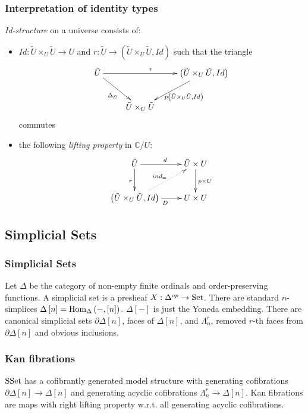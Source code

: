 \documentclass[dvipdfmx]{beamer}
\begin{document}
\begin{frame}
  \frametitle{Interpretation of identity types}
  {\it Id-structure} on a universe consists of:
  \begin{itemize}
    \item $Id : \tilde{U} \times _{U} \tilde{U} \to U$
    and $r : \tilde{U} \to
    \left( \tilde{U} \times _{U} \tilde{U} , Id\right)$
    such that the triangle
    \[
      \xymatrix{
        \tilde{U} \ar[rr]^{r}
        \ar[dr]_{\Delta _{\tilde{U}}}
        &
        & \left( \tilde{U} \times _{U} \tilde{U} , Id \right)
        \ar[dl]^{p \left( \tilde{U} \times _{U} \tilde{U} , Id \right)}
        \\
        & \tilde{U} \times _{U} \tilde{U}
        &
      }
    \]
    commutes
    \item the following {\it lifting property}
      in ${\mathbb C} / U$:
      \[
        \xymatrix{
          \tilde{U} \ar[r]^{d} \ar[d]_{r}
          & \tilde{U} \times U \ar[d]^{p \times U}
          \\
          \left( \tilde{U} \times _{U} \tilde{U} , Id \right)
          \ar@{.>}[ur]^{ind_{=}} \ar[r]_{D}
          & U \times U
        }
      \]
  \end{itemize}
\end{frame}

\subsection*{Simplicial Sets}

\begin{frame}
  \frametitle{Simplicial Sets}
  Let $\Delta$ be the category of
  non-empty finite ordinals and
  order-preserving functions.
  A simplicial set is a presheaf
  $X : \Delta^{op} \to {\rm Set}$.
  There are standard $n$-simplices
  $\Delta \left[ n \right] = {\rm Hom}_{\Delta}
  \left( - , \left[ n \right] \right)$.
  $\Delta \left[ - \right]$ is just the Yoneda embedding.
  There are canonical simplicial sets
  $\partial \Delta \left[ n \right]$,
  faces of $\Delta \left[ n \right]$,
  and $\Lambda_n^r$,
  removed $r$-th faces from $\partial \Delta \left[ n \right]$
  and obvious inclusions.
\end{frame}

\begin{frame}
  \frametitle{Kan fibrations}
  ${\rm SSet}$ has a cofibrantly generated model structure
  with generating cofibrations
  $\partial \Delta \left[ n \right] \to \Delta \left[ n \right]$
  and generating acyclic cofibrations
  $\Lambda_n^r \to \Delta \left[ n \right]$.
  Kan fibrations are maps with
  right lifting property w.r.t.
  all generating acyclic cofibrations.
\end{frame}
\end{document}
